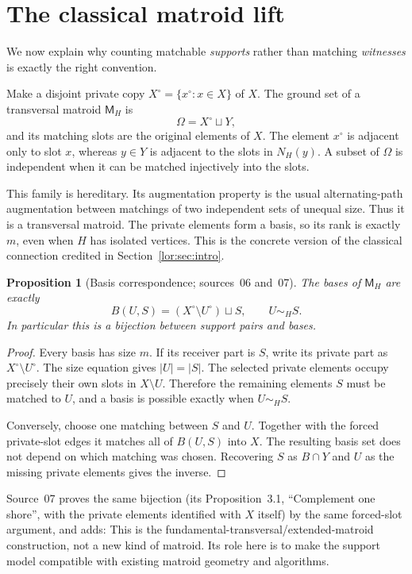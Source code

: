 \documentclass[11pt]{article}
\numberwithin{equation}{section}
\newtheorem{proposition}[theorem]{Proposition}
\theoremstyle{definition}
\begin{document}
\section{The classical matroid lift}
\label{lor:sec:lift}
We now explain why counting matchable \emph{supports} rather than matching
\emph{witnesses} is exactly the right convention.

Make a disjoint private copy $X^\circ=\{x^\circ:x\in X\}$ of $X$. The ground
set of a transversal matroid $\mathsf M_H$ is
\[
 \Omega=X^\circ\sqcup Y,
\]
and its matching slots are the original elements of $X$. The element
$x^\circ$ is adjacent only to slot $x$, whereas $y\in Y$ is adjacent to the
slots in $N_H(y)$. A subset of $\Omega$ is independent when it can be
matched injectively into the slots.

This family is hereditary. Its augmentation property is the usual
alternating-path augmentation between matchings of two independent sets
of unequal size. Thus it is a transversal matroid. The private elements
form a basis, so its rank is exactly $m$, even when $H$ has isolated
vertices. This is the concrete version of the classical connection
credited in Section~\ref{lor:sec:intro}.

\begin{proposition}[Basis correspondence; sources~06 and~07]\label{lor:prop:bases}
The bases of $\mathsf M_H$ are exactly
\begin{equation}
 B(U,S)=(X^\circ\setminus U^\circ)\sqcup S,
 \qquad U\sim_H S.
 \label{lor:eq:bases}
\end{equation}
In particular this is a bijection between support pairs and bases.
\end{proposition}
\begin{proof}
Every basis has size $m$. If its receiver part is $S$, write its private
part as $X^\circ\setminus U^\circ$. The size equation gives $|U|=|S|$.
The selected private elements occupy precisely their own slots in
$X\setminus U$. Therefore the remaining elements $S$ must be matched to
$U$, and a basis is possible exactly when $U\sim_H S$.

Conversely, choose one matching between $S$ and $U$. Together with the
forced private-slot edges it matches all of $B(U,S)$ into $X$. The resulting
basis set does not depend on which matching was chosen. Recovering $S$
as $B\cap Y$ and $U$ as the missing private elements gives the inverse.
\end{proof}

Source~07 proves the same bijection (its Proposition~3.1, ``Complement one
shore'', with the private elements identified with $X$ itself) by the same
forced-slot argument, and adds:
This is the fundamental-transversal/extended-matroid construction, not a new
kind of matroid. Its role here is to make the support model compatible with
existing matroid geometry and algorithms.
\end{document}

